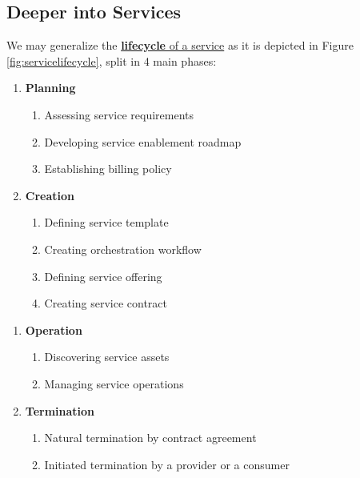 \subsection{Deeper into Services}
\begin{paracol}{2}

   We may generalize the \ul{\textbf{lifecycle} of a service} as it is depicted in Figure \ref{fig:servicelifecycle}, split in 4 main phases:
   \ns
   \begin{enumerate}
      \item \textbf{Planning}
      \begin{enumerate}
         \item Assessing service requirements
         \item Developing service enablement roadmap
         \item Establishing billing policy
      \end{enumerate}
      \item \textbf{Creation}
      \begin{enumerate}[ref=\theenumi{}.\roman*]
         \item Defining service template
         \item Creating orchestration workflow
         \item Defining service offering
         \item Creating service contract\label{enum:SLA}
      \end{enumerate}
   \end{enumerate}
   \switchcolumn
   \colfill
   \begin{enumerate}[start=3]
      \item \textbf{Operation}
      \begin{enumerate}
         \item Discovering service assets
         \item Managing service operations
      \end{enumerate}
      \item \textbf{Termination}
      \begin{enumerate}
         \item Natural termination by contract agreement
         \item Initiated termination by a provider or a consumer          
      \end{enumerate}
   \end{enumerate}
   \colfill
\end{paracol}
